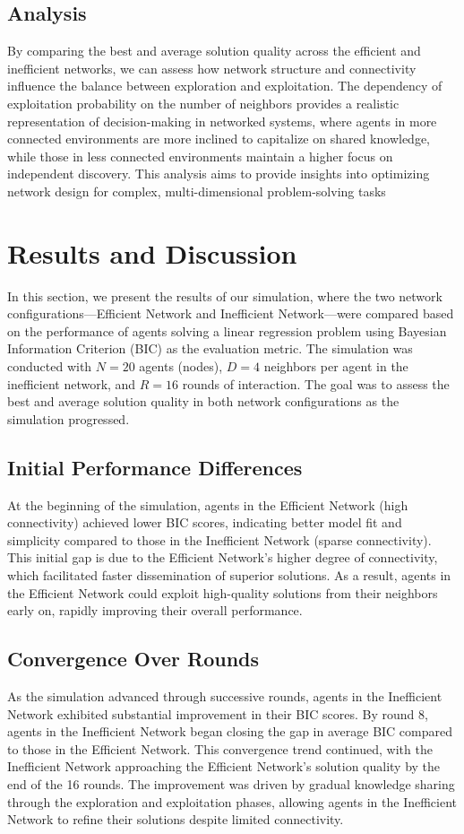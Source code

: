 \documentclass[conference]{IEEEtran}
\begin{document}
\subsection{Analysis}
By comparing the best and average solution quality across the efficient and inefficient networks, we can assess how network structure and connectivity influence the balance between exploration and exploitation. The dependency of exploitation probability on the number of neighbors provides a realistic representation of decision-making in networked systems, where agents in more connected environments are more inclined to capitalize on shared knowledge, while those in less connected environments maintain a higher focus on independent discovery. This analysis aims to provide insights into optimizing network design for complex, multi-dimensional problem-solving tasks

\section{Results and Discussion}

In this section, we present the results of our simulation, where the two network configurations—Efficient Network and Inefficient Network—were compared based on the performance of agents solving a linear regression problem using Bayesian Information Criterion (BIC) as the evaluation metric. The simulation was conducted with $N = 20$ agents (nodes), $D = 4$ neighbors per agent in the inefficient network, and $R = 16$ rounds of interaction. The goal was to assess the best and average solution quality in both network configurations as the simulation progressed.

\subsection{Initial Performance Differences}
At the beginning of the simulation, agents in the Efficient Network (high connectivity) achieved lower BIC scores, indicating better model fit and simplicity compared to those in the Inefficient Network (sparse connectivity). This initial gap is due to the Efficient Network’s higher degree of connectivity, which facilitated faster dissemination of superior solutions. As a result, agents in the Efficient Network could exploit high-quality solutions from their neighbors early on, rapidly improving their overall performance.

\subsection{Convergence Over Rounds}
As the simulation advanced through successive rounds, agents in the Inefficient Network exhibited substantial improvement in their BIC scores. By round 8, agents in the Inefficient Network began closing the gap in average BIC compared to those in the Efficient Network. This convergence trend continued, with the Inefficient Network approaching the Efficient Network’s solution quality by the end of the 16 rounds. The improvement was driven by gradual knowledge sharing through the exploration and exploitation phases, allowing agents in the Inefficient Network to refine their solutions despite limited connectivity.
\end{document}
